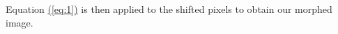 \documentclass[journal]{IEEEtran}
\begin{document}
Equation \hyperref[eq:1]{(\ref{eq:1})} is then applied to the shifted pixels to obtain our morphed image.

%
%



%
%
\end{document}
